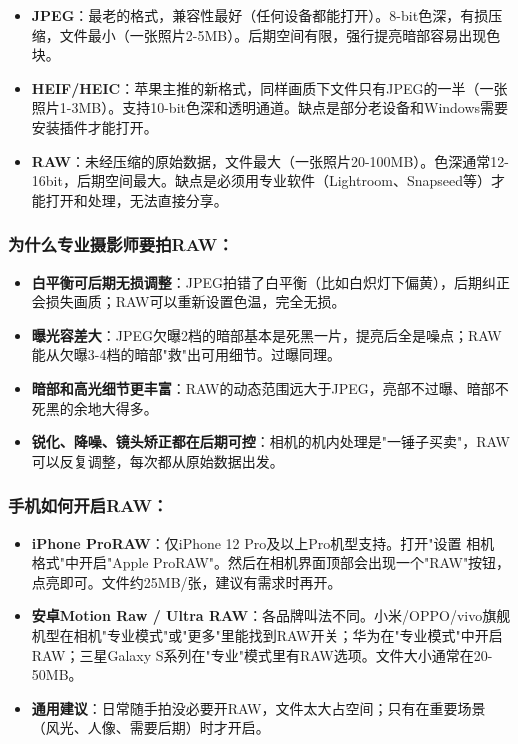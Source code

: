 \begin{itemize}
  \item \textbf{JPEG}：最老的格式，兼容性最好（任何设备都能打开）。8-bit色深，有损压缩，文件最小（一张照片2-5MB）。后期空间有限，强行提亮暗部容易出现色块。
  \item \textbf{HEIF/HEIC}：苹果主推的新格式，同样画质下文件只有JPEG的一半（一张照片1-3MB）。支持10-bit色深和透明通道。缺点是部分老设备和Windows需要安装插件才能打开。
  \item \textbf{RAW}：未经压缩的原始数据，文件最大（一张照片20-100MB）。色深通常12-16bit，后期空间最大。缺点是必须用专业软件（Lightroom、Snapseed等）才能打开和处理，无法直接分享。
\end{itemize}

\subsubsection*{为什么专业摄影师要拍RAW：}

\begin{itemize}
  \item \textbf{白平衡可后期无损调整}：JPEG拍错了白平衡（比如白炽灯下偏黄），后期纠正会损失画质；RAW可以重新设置色温，完全无损。
  \item \textbf{曝光容差大}：JPEG欠曝2档的暗部基本是死黑一片，提亮后全是噪点；RAW能从欠曝3-4档的暗部"救"出可用细节。过曝同理。
  \item \textbf{暗部和高光细节更丰富}：RAW的动态范围远大于JPEG，亮部不过曝、暗部不死黑的余地大得多。
  \item \textbf{锐化、降噪、镜头矫正都在后期可控}：相机的机内处理是"一锤子买卖"，RAW可以反复调整，每次都从原始数据出发。
\end{itemize}

\subsubsection*{手机如何开启RAW：}

\begin{itemize}
  \item \textbf{iPhone ProRAW}：仅iPhone 12 Pro及以上Pro机型支持。打开"设置 相机 格式"中开启"Apple ProRAW"。然后在相机界面顶部会出现一个"RAW"按钮，点亮即可。文件约25MB/张，建议有需求时再开。
  \item \textbf{安卓Motion Raw / Ultra RAW}：各品牌叫法不同。小米/OPPO/vivo旗舰机型在相机"专业模式"或"更多"里能找到RAW开关；华为在"专业模式"中开启RAW；三星Galaxy S系列在"专业"模式里有RAW选项。文件大小通常在20-50MB。
  \item \textbf{通用建议}：日常随手拍没必要开RAW，文件太大占空间；只有在重要场景（风光、人像、需要后期）时才开启。
\end{itemize}

